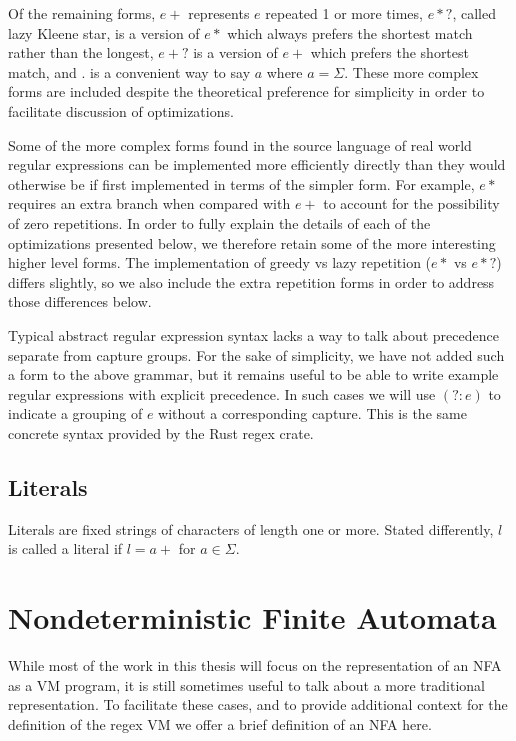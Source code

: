 Of the remaining forms, $e+$ represents $e$ repeated 1 or more times,
$e*?$, called lazy Kleene star, is a version of $e*$ which always prefers
the shortest match rather than the longest, $e+?$ is a version of
$e+$ which prefers the shortest match, and $.$ is a convenient
way to say $a$ where $a = \Sigma$. These more complex forms are
included despite the theoretical preference for simplicity in
order to facilitate discussion of optimizations.

Some of the more complex forms found in the source language of real
world regular expressions can be implemented more efficiently directly
than they would otherwise be if first implemented in terms of the
simpler form. For example, $e*$ requires an extra branch when compared
with $e+$ to account for the possibility of zero repetitions.
In order to fully explain the details of each of the
optimizations presented below, we therefore retain some of the more
interesting higher level forms. The implementation of greedy vs lazy
repetition ($e*$ vs $e*?$) differs
slightly, so we also include the extra repetition forms in order to
address those differences below.

Typical abstract regular expression syntax lacks a way to talk about
precedence separate from capture groups. For the sake of simplicity,
we have not added such a form to the above grammar, but it remains
useful to be able to write example regular expressions with explicit
precedence. In such cases we will use $(?:e)$ to indicate a grouping
of $e$ without a corresponding capture. This is the same concrete syntax
provided by the Rust regex crate.

\subsection{Literals}

Literals are fixed strings of characters of length one or more.
Stated differently, $l$ is called a literal if $l = a+$ for $a \in \Sigma$.

\section{Nondeterministic Finite Automata}
\label{section:nfadef}

While most of the work in this thesis will focus on the representation
of an NFA as a VM program, it is still sometimes useful to talk about
a more traditional representation. To facilitate these cases, and to
provide additional context for the definition of the regex VM we offer
a brief definition of an NFA here.

